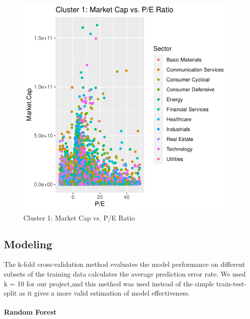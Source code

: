 \documentclass[11pt,]{article}
\begin{document}
\begin{figure}

{\centering \includegraphics{stock_analysis_files/figure-latex/pe ratio clust1-1} 

}

\caption{Cluster 1: Market Cap vs. P/E Ratio}\label{fig:pe ratio clust1}
\end{figure}

\hypertarget{modeling}{%
\subsection{Modeling}\label{modeling}}

The k-fold cross-validation method evaluates the model performance on
different subsets of the training data calculates the average prediction
error rate. We used k = 10 for our project,and this method was used
instead of the simple train-test-split as it gives a more valid
estimation of model effectiveness.

\hypertarget{random-forest}{%
\paragraph{\texorpdfstring{\textbf{Random Forest}\\
}{Random Forest }}\label{random-forest}}
\end{document}
